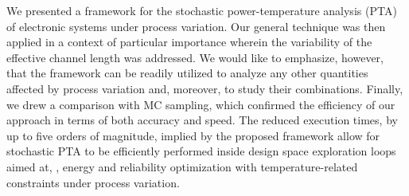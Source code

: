 We presented a framework for the stochastic power-temperature analysis (PTA) of electronic systems under process variation.
Our general technique was then applied in a context of particular importance wherein the variability of the effective channel length was addressed.
We would like to emphasize, however, that the framework can be readily utilized to analyze any other quantities affected by process variation and, moreover, to study their combinations.
Finally, we drew a comparison with MC sampling, which confirmed the efficiency of our approach in terms of both accuracy and speed.
The reduced execution times, by up to five orders of magnitude, implied by the proposed framework allow for stochastic PTA to be efficiently performed inside design space exploration loops aimed at, \eg, energy and reliability optimization with temperature-related constraints under process variation.
